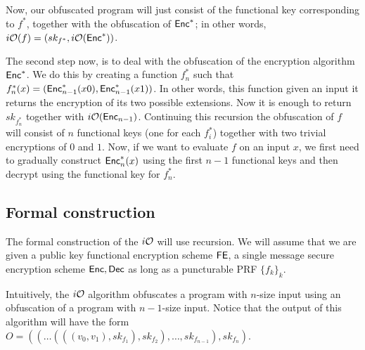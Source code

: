 Now, our obfuscated program will just consist of the functional key corresponding to $f^*$, together with the obfuscation of $\mathsf{Enc}^*$; in other words, $i\mathcal{O}(f)=(sk_{f^*},i\mathcal{O}(\mathsf{Enc}^*))$.

The second step now, is to deal with the obfuscation of the encryption algorithm $\mathsf{Enc}^*$. We do this by creating a function $f^*_n$ such that $f^*_n(x)= (\mathsf{Enc}^*_{n-1}(x0),\mathsf{Enc}^*_{n-1}(x1))$. In other words, this function given an input it returns the encryption of its two possible extensions. Now it is enough to return $sk_{f^*_n}$ together with $i\mathcal{O}(\mathsf{Enc}_{n-1})$. Continuing this recursion the obfuscation of $f$ will consist of $n$ functional keys  (one for each $f^*_{i}$) together with two trivial encryptions of $0$ and $1$. Now, if we want to evaluate $f$ on an input $x$, we first need to gradually construct $\mathsf{Enc}^*_n(x)$ using the first $n-1$ functional keys and then decrypt using the functional key for $f^*_n$.

\subsection{Formal construction}
The formal construction of the $i\mathcal{O}$ will use recursion. We will assume that we are given a public key functional encryption scheme $\mathsf{FE}$, a single message secure encryption scheme $\mathsf{Enc},\mathsf{Dec}$ as long as a puncturable PRF $\{f_k\}_k$.

\begin{figure}[h!]
\centering
{}

\end{figure}
Intuitively, the $i\mathcal{O}$ algorithm obfuscates a program with $n$-size input using an obfuscation of a program with $n-1$-size input. Notice that the output of this algorithm will have the form $O=((\ldots(((v_0,v_1),sk_{f_1}),sk_{f_2}),\ldots,sk_{f_{n-1}}),sk_{f_n})$.


